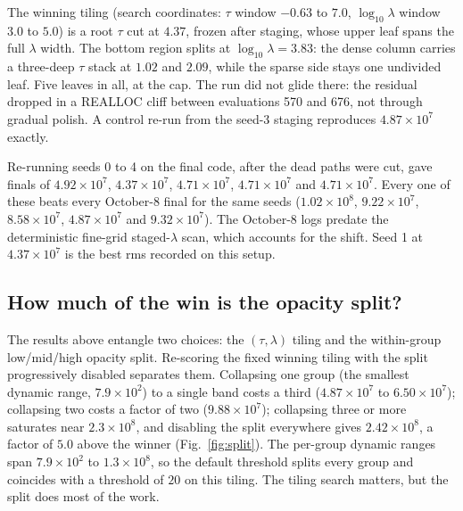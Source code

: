 \documentclass{aa}
\begin{document}
   The winning tiling (search coordinates: $\tau$ window $-0.63$ to
   $7.0$, $\log_{10}\lambda$ window $3.0$ to $5.0$) is a root $\tau$ cut
   at $4.37$, frozen after staging, whose upper leaf spans the full
   $\lambda$ width. The bottom region splits at $\log_{10}\lambda = 3.83$:
   the dense column carries a three-deep $\tau$ stack at $1.02$ and
   $2.09$, while the sparse side stays one undivided leaf. Five leaves in
   all, at the cap. The run did not glide there: the residual dropped in
   a REALLOC cliff between evaluations 570 and 676, not through gradual
   polish. A control re-run from the seed-3 staging reproduces
   $4.87\times10^{7}$ exactly.

   Re-running seeds 0 to 4 on the final code, after the dead paths were
   cut, gave finals of $4.92\times10^{7}$, $4.37\times10^{7}$,
   $4.71\times10^{7}$, $4.71\times10^{7}$ and $4.71\times10^{7}$.
   Every one of these beats every October-8 final for the same seeds
   ($1.02\times10^{8}$, $9.22\times10^{7}$, $8.58\times10^{7}$,
   $4.87\times10^{7}$ and $9.32\times10^{7}$). The October-8 logs predate
   the deterministic fine-grid staged-$\lambda$ scan, which accounts for
   the shift. Seed 1 at $4.37\times10^{7}$ is the best rms recorded on
   this setup.

\subsection{How much of the win is the opacity split?}
\label{sec:split}

   The results above entangle two choices: the $(\tau,\lambda)$ tiling
   and the within-group low/mid/high opacity split. Re-scoring the fixed
   winning tiling with the split progressively disabled separates them.
   Collapsing one group (the smallest dynamic range, $7.9\times10^{2}$)
   to a single band costs a third ($4.87\times10^{7}$ to
   $6.50\times10^{7}$); collapsing two costs a factor of two
   ($9.88\times10^{7}$); collapsing three or more saturates near
   $2.3\times10^{8}$, and disabling the split everywhere gives
   $2.42\times10^{8}$, a factor of $5.0$ above the winner
   (Fig.~\ref{fig:split}). The per-group dynamic ranges span
   $7.9\times10^{2}$ to $1.3\times10^{8}$, so the default threshold
   splits every group and coincides with a threshold of $20$ on this
   tiling. The tiling search matters, but the split does most of the
   work.
\end{document}
